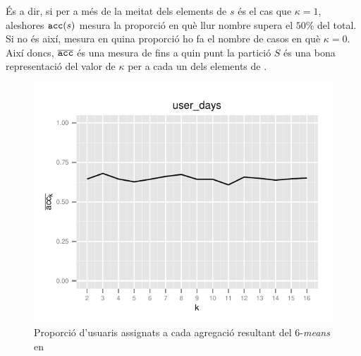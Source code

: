\documentclass[
	a4paper,
	twoside,
	justified
]{tufte-book}
\begin{document}
És a dir, si per a més de la meitat dels elements de $s$ és el cas que $\kappa = 1$, aleshores $\texttt{acc}(s)$ mesura la proporció en què llur nombre supera el $50\%$ del total. Si no és així, mesura en quina proporció ho fa el nombre de casos en què $\kappa = 0$. Així doncs, $\overline{\texttt{acc}}$ és una mesura de fins a quin punt la partició $S$ és una bona representació del valor de $\kappa$ per a cada un dels elements de .   

\begin{figure}
\begin{center}
\includegraphics{day_presence_clust_acc_line}
\caption{
\label{graph:day_presence_clust_acc_line}
	Proporció d'usuaris assignats a cada agregació resultant del 6-\emph{means} en  
}
\end{center}
\end{figure}
\end{document}
